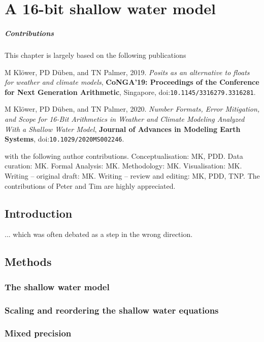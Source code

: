 \chapter{A 16-bit shallow water model}
\label{chap:shallow_water}

\paragraph{Contributions} This chapter is largely based on the following publications

\vspace{\baselineskip}
\indent M Klöwer, PD Düben, and TN Palmer, 2019. \emph{Posits as an alternative to floats for weather and climate models}, \textbf{CoNGA'19: Proceedings of the Conference for Next Generation Arithmetic}, Singapore, doi:\texttt{10.1145/3316279.3316281}.

\indent M Klöwer, PD Düben, and TN Palmer, 2020. \emph{Number Formats, Error Mitigation, and Scope for 16-Bit Arithmetics in Weather and Climate Modeling Analyzed With a Shallow Water Model}, \textbf{Journal of Advances in Modeling Earth Systems}, doi:\texttt{10.1029/2020MS002246}.
\vspace{\baselineskip}

\noindent with the following author contributions. Conceptualisation: MK, PDD. Data curation: MK. Formal Analysis: MK. Methodology: MK. Visualisation: MK. Writing – original draft: MK. Writing – review and editing: MK, PDD, TNP. The contributions of Peter and Tim are highly appreciated.

\section{Introduction}

... which was often debated as a step in the wrong direction.

\section{Methods}
\subsection{The shallow water model}
\subsection{Scaling and reordering the shallow water equations}
\subsection{Mixed precision}
